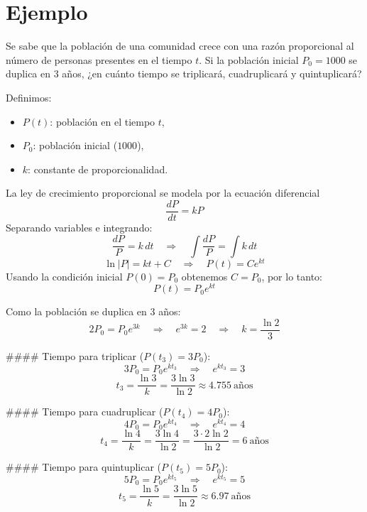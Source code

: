 \documentclass{article}
\begin{document}
\section*{Ejemplo}
Se sabe que la población de una comunidad crece con una razón proporcional al número de personas presentes en el tiempo $t$. Si la población inicial $P_0 = 1000$ se duplica en $3$ años, ¿en cuánto tiempo se triplicará, cuadruplicará y quintuplicará?

Definimos:
\begin{itemize}
  \item $P(t)$: población en el tiempo $t$,
  \item $P_0$: población inicial ($1000$),
  \item $k$: constante de proporcionalidad.
\end{itemize}

La ley de crecimiento proporcional se modela por la ecuación diferencial
\[
\frac{dP}{dt}=kP
\]
Separando variables e integrando:
\[
\frac{dP}{P}=k\,dt \quad\Rightarrow\quad \int\frac{dP}{P}=\int k\,dt
\]
\[
\ln|P|=kt+C \quad\Rightarrow\quad P(t)=Ce^{kt}
\]
Usando la condición inicial $P(0)=P_0$ obtenemos $C=P_0$, por lo tanto:
\[
P(t)=P_0 e^{kt}
\]

Como la población se duplica en $3$ años:
\[
2P_0 = P_0 e^{3k} \quad\Rightarrow\quad e^{3k}=2 \quad\Rightarrow\quad k=\frac{\ln 2}{3}
\]

#### Tiempo para triplicar ($P(t_3)=3P_0$):
\[
3P_0 = P_0 e^{k t_3} \quad\Rightarrow\quad e^{k t_3}=3
\]
\[
t_3=\frac{\ln 3}{k}=\frac{3\ln 3}{\ln 2}\approx 4.755\ \text{años}
\]

#### Tiempo para cuadruplicar ($P(t_4)=4P_0$):
\[
4P_0 = P_0 e^{k t_4} \quad\Rightarrow\quad e^{k t_4}=4
\]
\[
t_4=\frac{\ln 4}{k}=\frac{3\ln 4}{\ln 2}=\frac{3\cdot 2\ln 2}{\ln 2}=6\ \text{años}
\]

#### Tiempo para quintuplicar ($P(t_5)=5P_0$):
\[
5P_0 = P_0 e^{k t_5} \quad\Rightarrow\quad e^{k t_5}=5
\]
\[
t_5=\frac{\ln 5}{k}=\frac{3\ln 5}{\ln 2}\approx 6.97\ \text{años}
\]
\end{document}

